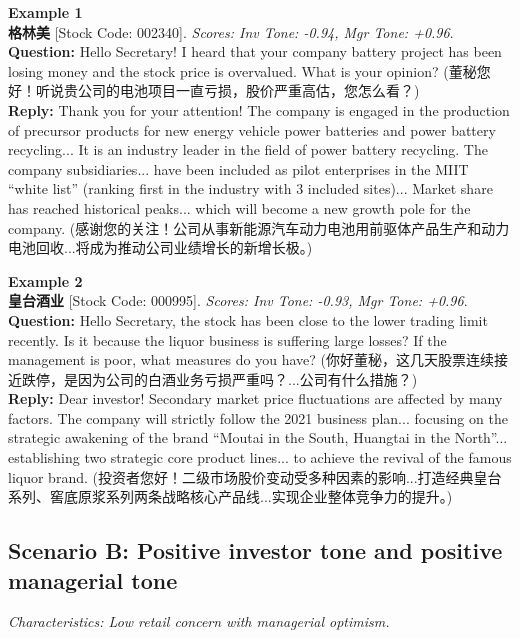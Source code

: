 \documentclass[12pt]{article}
\begin{document}
\noindent \textbf{Example 1} \\
\textbf{格林美} [Stock Code: 002340]. \textit{Scores: Inv Tone: -0.94, Mgr Tone: +0.96}. \\
\textbf{Question:} Hello Secretary! I heard that your company battery project has been losing money and the stock price is overvalued. What is your opinion? (董秘您好！听说贵公司的电池项目一直亏损，股价严重高估，您怎么看？) \\
\textbf{Reply:} Thank you for your attention! The company is engaged in the production of precursor products for new energy vehicle power batteries and power battery recycling... It is an industry leader in the field of power battery recycling. The company subsidiaries... have been included as pilot enterprises in the MIIT ``white list'' (ranking first in the industry with 3 included sites)... Market share has reached historical peaks... which will become a new growth pole for the company. (感谢您的关注！公司从事新能源汽车动力电池用前驱体产品生产和动力电池回收...将成为推动公司业绩增长的新增长极。)
\vspace{0.4cm}

\noindent \textbf{Example 2} \\
\textbf{皇台酒业} [Stock Code: 000995]. \textit{Scores: Inv Tone: -0.93, Mgr Tone: +0.96}. \\
\textbf{Question:} Hello Secretary, the stock has been close to the lower trading limit recently. Is it because the liquor business is suffering large losses? If the management is poor, what measures do you have? (你好董秘，这几天股票连续接近跌停，是因为公司的白酒业务亏损严重吗？...公司有什么措施？) \\
\textbf{Reply:} Dear investor! Secondary market price fluctuations are affected by many factors. The company will strictly follow the 2021 business plan... focusing on the strategic awakening of the brand ``Moutai in the South, Huangtai in the North''... establishing two strategic core product lines... to achieve the revival of the famous liquor brand. (投资者您好！二级市场股价变动受多种因素的影响...打造经典皇台系列、窖底原浆系列两条战略核心产品线...实现企业整体竞争力的提升。)
\vspace{0.6cm}

\subsection{Scenario B: Positive investor tone and positive managerial tone}
\textit{Characteristics: Low retail concern with managerial optimism.}
\end{document}
